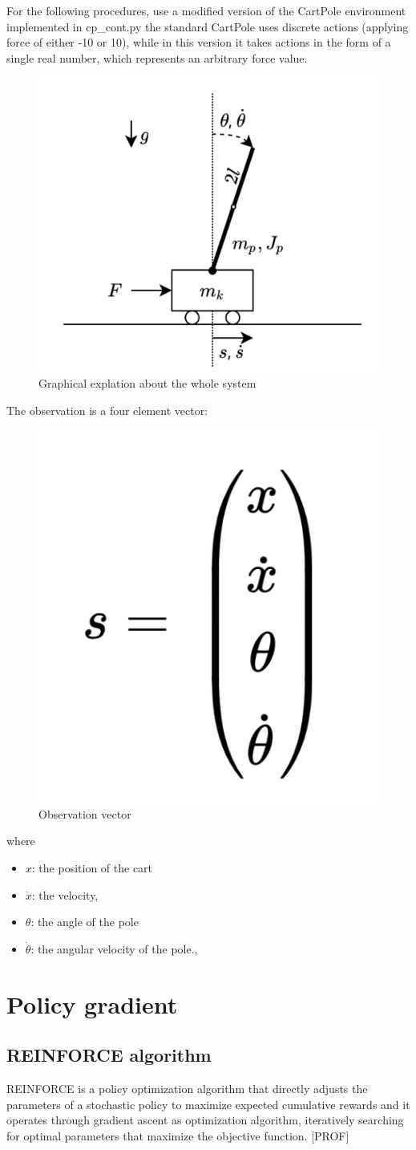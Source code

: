 \documentclass{article}
\begin{document}
For the following procedures, use a modified version of the CartPole environment implemented in cp\_cont.py the standard CartPole uses discrete actions (applying force of either -10 or 10), while in this version it takes actions in the form of a single real number, which represents an arbitrary
force value.
\begin{figure}[h]
	\centering
	\includegraphics[width=0.5\linewidth]{../data/images/cart.png}
	\caption{Graphical explation about the whole system}
	\label{fig:plot1}
\end{figure}

\newpage

The observation is a four element vector: 
\begin{figure}[h]
	\centering
	\includegraphics[width=0.2\linewidth]{../data/images/vector.png}
	\caption{Observation vector}
	\label{fig:plot2}
\end{figure}

where 
\begin{itemize}
	\item $x$: the position of the cart
	\item $\dot{x}$: the velocity, 
	\item $\theta$:  the angle of the pole
	\item $\dot{\theta}$: the angular velocity of the pole., 	
\end{itemize}

\section{Policy gradient}

\subsection{REINFORCE algorithm}
REINFORCE is a policy optimization algorithm that directly adjusts the parameters of a stochastic policy to maximize expected cumulative rewards and it operates through gradient ascent as optimization algorithm, iteratively searching for optimal parameters that maximize the objective function. [PROF]
\end{document}
